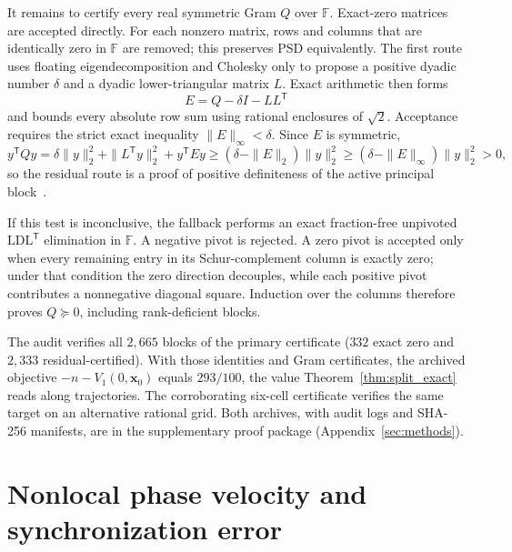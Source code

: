 \documentclass[aps,prx,reprint,nofootinbib,longbibliography,floatfix]{revtex4-2}
\theoremstyle{plain}
\theoremstyle{remark}
\newcommand{\xv}{\boldsymbol{x}}
\begin{document}
It remains to certify every real symmetric Gram $Q$ over $\mathbb F$. Exact-zero
matrices are accepted directly. For each nonzero matrix, rows and columns that
are identically zero in $\mathbb F$ are removed; this preserves PSD
equivalently. The first route uses floating eigendecomposition and Cholesky
only to propose a positive dyadic number $\delta$ and a dyadic
lower-triangular matrix $L$. Exact arithmetic then forms
\begin{equation}
E=Q-\delta I-LL^{\mathsf T}
\label{eq:gram_residual}
\end{equation}
and bounds every absolute row sum using rational enclosures of $\sqrt2$.
Acceptance requires the strict exact inequality $\|E\|_\infty<\delta$. Since
$E$ is symmetric,
\begin{equation}
y^{\mathsf T}Qy
=\delta\|y\|_2^2+\|L^{\mathsf T}y\|_2^2+y^{\mathsf T}Ey
\ge(\delta-\|E\|_2)\|y\|_2^2
\ge(\delta-\|E\|_\infty)\|y\|_2^2>0,
\end{equation}
so the residual route is a proof of positive definiteness of the active
principal block~\cite{Rump06,Peyrl08}.

If this test is inconclusive, the fallback performs an exact fraction-free
unpivoted $\mathrm{LDL}^{\mathsf T}$ elimination in $\mathbb F$. A negative
pivot is rejected. A zero pivot is accepted only when every remaining entry
in its Schur-complement column is exactly zero; under that condition the zero
direction decouples, while each positive pivot contributes a nonnegative
diagonal square. Induction over the columns therefore proves $Q\succeq0$,
including rank-deficient blocks.

The audit verifies all $2{,}665$ blocks of the primary certificate ($332$
exact zero and $2{,}333$ residual-certified). With those identities and Gram
certificates, the archived objective $-n-V_1(0,\xv_0)$ equals $293/100$, the
value Theorem~\ref{thm:split_exact} reads along trajectories. The
corroborating six-cell certificate verifies the same target on an
alternative rational grid. Both archives, with audit logs and SHA-256
manifests, are in the supplementary proof package
(Appendix~\ref{sec:methods}).

\section{Nonlocal phase velocity and synchronization error}
\label{app:coordinates}
\end{document}
